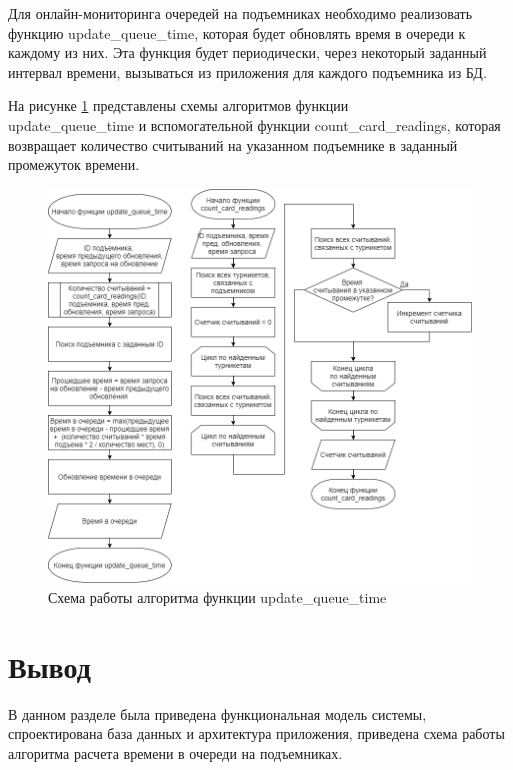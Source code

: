 


Для онлайн-мониторинга очередей на подъемниках необходимо реализовать функцию update\_queue\_time, которая будет обновлять время в очереди к каждому из них. Эта функция будет периодически, через некоторый заданный интервал времени, вызываться из приложения для каждого подъемника из БД. 

На рисунке \ref{img:function} представлены схемы алгоритмов функции \\update\_queue\_time и вспомогательной функции count\_card\_readings, которая возвращает количество считываний на указанном подъемнике в заданный промежуток времени.

\clearpage
\begin{figure}[h!]
	\begin{center}
		\includegraphics[scale=0.5]{../imgs/function.png}
	\end{center}
	\captionsetup{justification=centering}
	\caption{Схема работы алгоритма функции update\_queue\_time}
	\label{img:function}
\end{figure}


\section*{Вывод}

В данном разделе была приведена функциональная модель системы, спроектирована база данных и архитектура приложения, приведена схема работы алгоритма расчета времени в очереди на подъемниках.




